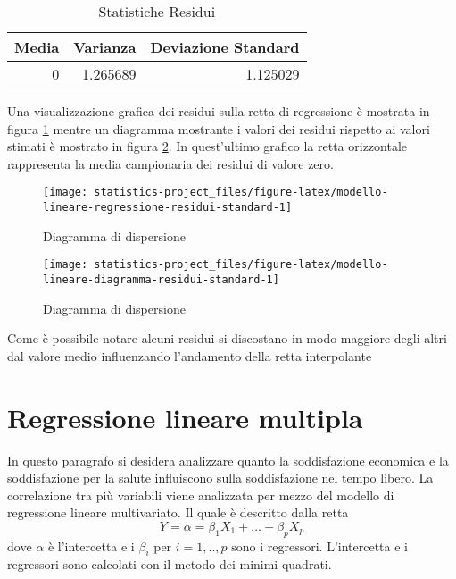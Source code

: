 \documentclass[]{book}
\begin{document}
\begin{table}

\caption{\label{tab:modello-lineare-residui-statistiche}Statistiche Residui}
\centering
\begin{tabular}[t]{r|r|r}
\hline
Media & Varianza & Deviazione Standard\\
\hline
0 & 1.265689 & 1.125029\\
\hline
\end{tabular}
\end{table}

Una visualizzazione grafica dei residui sulla retta di regressione è
mostrata in figura
\ref{fig:modello-lineare-regressione-residui-standard} mentre un
diagramma mostrante i valori dei residui rispetto ai valori stimati è
mostrato in figura \ref{fig:modello-lineare-diagramma-residui-standard}.
In quest'ultimo grafico la retta orizzontale rappresenta la media
campionaria dei residui di valore zero.

\begin{figure}

{\centering \texttt{[image: statistics-project\_files/figure-latex/modello-lineare-regressione-residui-standard-1]} 

}

\caption{Diagramma di dispersione}\label{fig:modello-lineare-regressione-residui-standard}
\end{figure}

\begin{figure}

{\centering \texttt{[image: statistics-project\_files/figure-latex/modello-lineare-diagramma-residui-standard-1]} 

}

\caption{Diagramma di dispersione}\label{fig:modello-lineare-diagramma-residui-standard}
\end{figure}

Come è possibile notare alcuni residui si discostano in modo maggiore
degli altri dal valore medio influenzando l'andamento della retta
interpolante

\section{Regressione lineare
multipla}\label{regressione-lineare-multipla}

In questo paragrafo si desidera analizzare quanto la soddisfazione
economica e la soddisfazione per la salute influiscono sulla
soddisfazione nel tempo libero. La correlazione tra più variabili viene
analizzata per mezzo del modello di regressione lineare multivariato. Il
quale è descritto dalla retta
\[Y = \alpha = \beta_1 X_1 +\dots + \beta_p X_p\] dove \(\alpha\) è
l'intercetta e i \(\beta_i\) per \(i=1,..,p\) sono i regressori.
L'intercetta e i regressori sono calcolati con il metodo dei minimi
quadrati.
\end{document}
